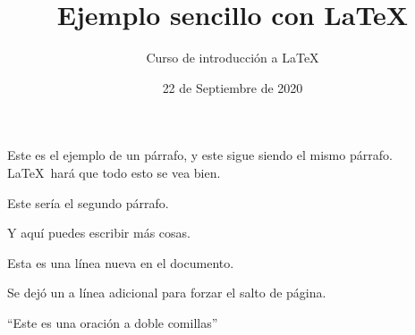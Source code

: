 \documentclass[10pt,letterpaper]{article}
\title{Ejemplo sencillo con \LaTeX}
\author{Curso de introducción a LaTeX}
\date{22 de Septiembre de 2020}
\begin{document}
	\maketitle
Este     es el ejemplo de un párrafo, 
y este sigue
siendo el mismo párrafo. \LaTeX\ hará que todo esto se vea bien.

Este sería el segundo párrafo. %

Y aquí puedes escribir más cosas. 

Esta es una línea nueva en el documento.

Se dejó un a línea adicional para forzar el salto de página.

``Este es una oración a doble comillas''
\end{document}
